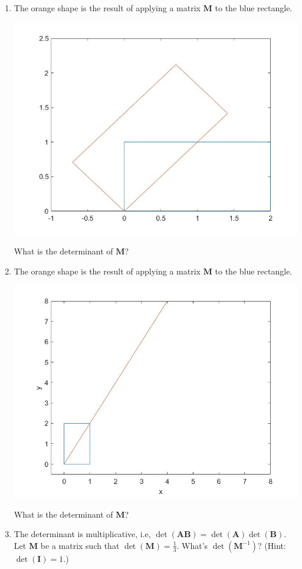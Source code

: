 \begin{enumerate}

\item The orange shape is the result of applying a matrix $\mathbf{M}$ to the blue rectangle.
\begin{center}        \includegraphics[width=.75\textwidth]{FacesNight2/figs/quizrot.jpg}
 \end{center}
What is the determinant of $\mathbf{M}$?

\item The orange shape is the result of applying a matrix $\mathbf{M}$ to the blue rectangle.
\begin{center}        \includegraphics[width=.75\textwidth]{FacesDay2/figs/mat3.jpg}
 \end{center}
What is the determinant of $\mathbf{M}$?

\item The determinant is multiplicative, i.e, $\det(\mathbf{AB})=\det(\mathbf{A})\det(\mathbf{B})$. Let $\mathbf{M}$ be a matrix such that $\det(\mathbf{M})=\frac{1}{3}$. What's $\det(\mathbf{M}^{-1})$? (Hint: $\det(\mathbf{I})=1$.)


\end{enumerate}
